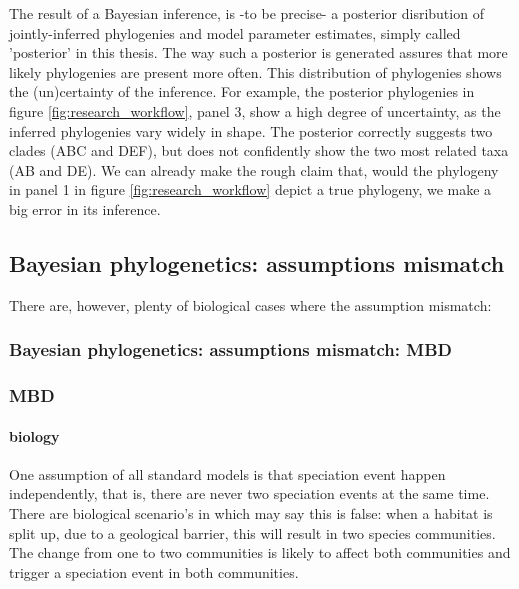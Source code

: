 The result of a Bayesian inference, is -to be precise- a posterior
disribution of jointly-inferred phylogenies and model parameter estimates,
simply called 'posterior' in this thesis.
The way such a posterior is generated assures that more likely phylogenies 
are present more often. 
This distribution of phylogenies shows the
(un)certainty of the inference.
For example, the posterior phylogenies in figure \ref{fig:research_workflow},
panel 3, show a high degree of uncertainty, as the
inferred phylogenies vary widely in shape. The posterior correctly
suggests two clades (ABC and DEF), but does not confidently show
the two most related taxa (AB and DE). We can already make 
the rough claim that, would the phylogeny in panel 1 
in figure \ref{fig:research_workflow} depict
a true phylogeny, we make a big error in its inference.

\subsection{Bayesian phylogenetics: assumptions mismatch}

There are, however, plenty of biological cases where the assumption
mismatch: 

\subsubsection{Bayesian phylogenetics: assumptions mismatch: MBD}

\subsubsection{MBD}

\paragraph{biology}

One assumption of all standard models is that speciation event happen
independently, that is, there are never two speciation events at the same time. 
There are biological scenario's in which may say
this is false: when a habitat is split up, 
due to a geological barrier, this will result in two 
species communities. The change from one to two communities is likely
to affect both communities and trigger a speciation event in both
communities. 

